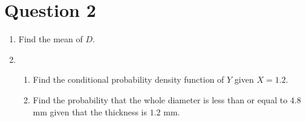 \documentclass[13pt]{article}
\begin{document}
\newpage
\section*{Question 2}
\begin{enumerate}[label=(\arabic*)]
\item Find the mean of $D$.
\item
  \begin{enumerate}[label=(\roman*)]
  \item Find the conditional probability density function of $Y$ given
    $X = 1.2$.
  \item Find the probability that the whole diameter is less than or
    equal to $4.8$ mm given that the thickness is $1.2$ mm.
  \end{enumerate}
\end{enumerate}
\end{document}
